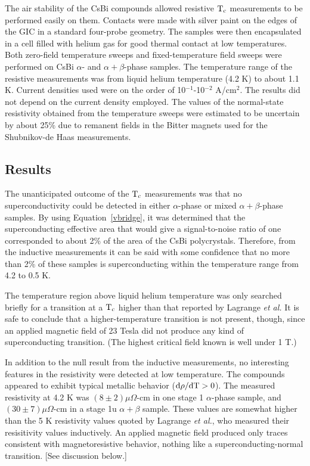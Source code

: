 	The air stability of the CsBi compounds allowed resistive $\rm T_c$
measurements to  be performed  easily on  them.   Contacts  were  made with
silver paint on  the edges  of the GIC  in a standard  four-probe geometry.
The samples  were then encapsulated in  a cell filled with helium   gas for
good  thermal  contact at  low temperatures.   Both  zero-field temperature
sweeps and fixed-temperature field sweeps  were performed on CsBi $\alpha$-
and $\alpha + \beta$-phase samples.  The temperature range of the resistive
measurements  was from liquid  helium temperature (4.2 K)  to  about 1.1 K.
Current densities used were on the order of 10$^{-1}$-10$^{-2}$ A/cm$^{2}$.
The results did not depend on the current density employed.  The values of
the normal-state resistivity obtained from the temperature sweeps were
estimated to be uncertain by about 25\% due to remanent fields in the
Bitter magnets used for the Shubnikov-de Haas measurements.

\subsection{Results}
\label{csbi:tcres}

	The unanticipated outcome of the $\rm T_c$ measurements was that no
superconductivity could  be  detected in  either  $\alpha$-phase   or mixed
$\alpha + \beta$-phase samples.\cite{E291} By using Equation~\ref{vbridge},
it was determined that the superconducting effective area that would give a
signal-to-noise ratio of one corresponded to about 2\%  of  the area of the
CsBi  polycrystals.  Therefore, from the inductive  measurements it  can be
said with   some confidence that   no more  than 2\%  of  these  samples is
superconducting within the temperature range from 4.2 to 0.5 K.

	The temperature region  above  liquid helium temperature  was  only
searched briefly for a transition at a $\rm T_c$ higher  than that reported
by Lagrange {\em et al.}  It is safe to  conclude that a higher-temperature
transition  is not present, though, since  an applied magnetic  field of 23
Tesla did not produce any kind of superconducting transition.  (The highest
critical field known is well under 1 T.\cite{iye82})

	In addition to the null result from the inductive measurements, no
interesting features in the resistivity were detected at low temperature.
The compounds appeared to exhibit typical metallic behavior ($\rm d\rho/dT
> 0$).  The measured resistivity at 4.2 K was $(8 \pm 2) \mu\Omega$-cm in
one stage 1 $\alpha$-phase sample, and $(30 \pm 7) \mu\Omega$-cm in a stage
1u $\alpha +
\beta$ sample.  These values are somewhat higher than the 5 K resistivity values quoted
by     Lagrange  {\em et   al.},   who measured   their resisitivity values
inductively.\cite{mcrae85} An  applied magnetic field produced  only traces
consistent    with    magnetoresistive behavior,      nothing     like    a
superconducting-normal transition.  [See discussion below.]

